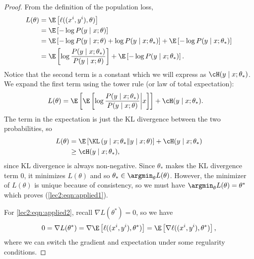 \begin{proof}
From the definition of the population loss,
\begin{align}
    L(\theta) &= \E \left[ \ell((x\sp{i}, y\sp{i}), \theta) \right]\\
    &= \E \left[ - \log P(y \mid x; \theta) \right] \\
    &= \E \left[ - \log P(y \mid x; \theta) + \log P(y \mid x; \theta_*) \right] + \E \left[ - \log P(y \mid x; \theta_*) \right] \\
    &= \E \left[ \log \frac{P(y \mid x; \theta_*)}{P(y \mid x; \theta)} \right] + \E \left[ - \log P(y \mid x; \theta_*) \right].
\end{align}
Notice that the second term is a constant which we will express as $\cH(y \mid x; \theta_*)$. We expand the first term using the tower rule (or law of total expectation):
\begin{align}
    L(\theta) &= \E \left[ \E \left[ \log \frac{P(y \mid x; \theta_*)}{P(y \mid x; \theta)} \biggr\vert x \right] \right] + \cH(y \mid x; \theta_*).
\end{align}
The term in the expectation is just the KL divergence between the two probabilities, so 
\begin{align}
    L(\theta) &= \E \left[ \KL \left( y \mid x; \theta_* \| y \mid x; \theta \right) \right] + \cH(y \mid x; \theta_*) \\
    &\geq \cH(y \mid x; \theta_*),
\end{align}
since KL divergence is always non-negative. Since $\theta_*$ makes the KL divergence term 0, it minimizes $L(\theta)$ and so $\theta_* \in \argmin_\theta L(\theta)$. However, the minimizer of $L(\theta)$ is unique because of consistency, so  we must have $\argmin_\theta L(\theta) = \theta^*$ which proves (\ref{lec2:eqn:applied1}).

For \eqref{lec2:eqn:applied2}, recall $\nabla L(\theta^*) = 0$, so we have
\begin{equation}
0 = \nabla L(\theta^*) = \nabla \E \left[ \ell((x\sp{i}, y\sp{i}), \theta^*) \right] = \E \left[ \nabla \ell((x\sp{i}, y\sp{i}), \theta^*) \right],
\end{equation}
where we can switch the gradient and expectation under some regularity conditions.


\end{proof}
